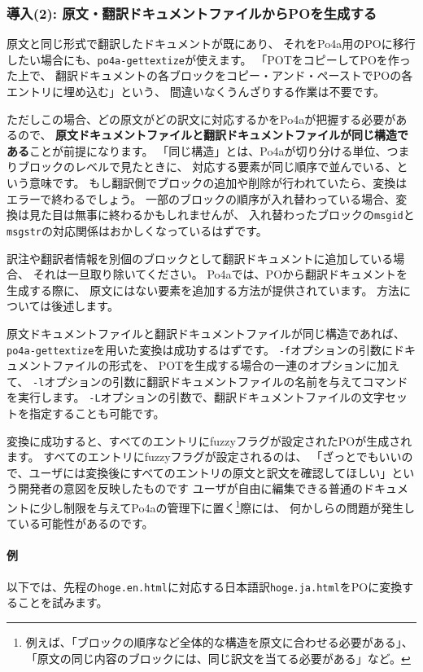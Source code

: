 \documentclass[mingoth,a4paper]{jsarticle}
\begin{document}
\subsubsection{導入(2): 原文・翻訳ドキュメントファイルからPOを生成する}

原文と同じ形式で翻訳したドキュメントが既にあり、
それをPo4a用のPOに移行したい場合にも、\texttt{po4a-gettextize}が使えます。
「POTをコピーしてPOを作った上で、
翻訳ドキュメントの各ブロックをコピー・アンド・ペーストでPOの各エントリに埋め込む」という、
間違いなくうんざりする作業は不要です。

ただしこの場合、どの原文がどの訳文に対応するかをPo4aが把握する必要があるので、
{\bf 原文ドキュメントファイルと翻訳ドキュメントファイルが同じ構造である}ことが前提になります。
「同じ構造」とは、Po4aが切り分ける単位、つまりブロックのレベルで見たときに、
対応する要素が同じ順序で並んでいる、という意味です。
もし翻訳側でブロックの追加や削除が行われていたら、変換はエラーで終わるでしょう。
一部のブロックの順序が入れ替わっている場合、変換は見た目は無事に終わるかもしれませんが、
入れ替わったブロックの\texttt{msgid}と\texttt{msgstr}の対応関係はおかしくなっているはずです。

訳注や翻訳者情報を別個のブロックとして翻訳ドキュメントに追加している場合、
それは一旦取り除いてください。
Po4aでは、POから翻訳ドキュメントを生成する際に、
原文にはない要素を追加する方法が提供されています。
方法については後述します。

原文ドキュメントファイルと翻訳ドキュメントファイルが同じ構造であれば、
\texttt{po4a-gettextize}を用いた変換は成功するはずです。
\texttt{-f}オプションの引数にドキュメントファイルの形式を、
POTを生成する場合の一連のオプションに加えて、
\texttt{-l}オプションの引数に翻訳ドキュメントファイルの名前を与えてコマンドを実行します。
\texttt{-L}オプションの引数で、翻訳ドキュメントファイルの文字セットを指定することも可能です。

変換に成功すると、すべてのエントリにfuzzyフラグが設定されたPOが生成されます。
すべてのエントリにfuzzyフラグが設定されるのは、
「ざっとでもいいので、ユーザには変換後にすべてのエントリの原文と訳文を確認してほしい」という開発者の意図を反映したものです
ユーザが自由に編集できる普通のドキュメントに少し制限を与えてPo4aの管理下に置く\footnote{例えば、「ブロックの順序など全体的な構造を原文に合わせる必要がある」、「原文の同じ内容のブロックには、同じ訳文を当てる必要がある」など。}際には、
何かしらの問題が発生している可能性があるのです。

\paragraph{例}
以下では、先程の\texttt{hoge.en.html}に対応する日本語訳\texttt{hoge.ja.html}をPOに変換することを試みます。
\end{document}
